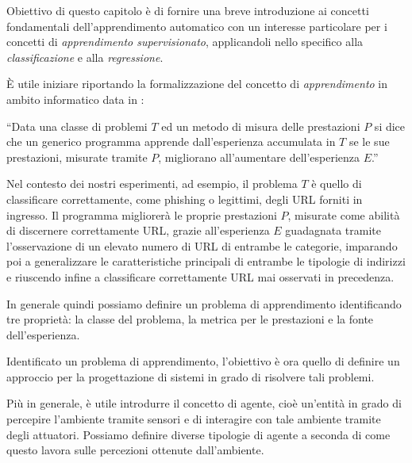 \documentclass[../../main.tex]{subfiles}
\begin{document}
    Obiettivo di questo capitolo è di fornire una breve introduzione ai concetti fondamentali dell'apprendimento automatico con un interesse particolare per i concetti di \textit{apprendimento supervisionato}, applicandoli nello specifico alla \textit{classificazione} e alla \textit{regressione}.

    È utile iniziare riportando la formalizzazione del concetto di \textit{apprendimento} in ambito informatico data in \cite{Mitchell97}:
    
    ``Data una classe di problemi $T$ ed un metodo di misura delle prestazioni $P$ si dice che un generico programma apprende dall'esperienza accumulata in $T$ se le sue prestazioni, misurate tramite $P$, migliorano all'aumentare dell'esperienza $E$.'' 

    Nel contesto dei nostri esperimenti, ad esempio, il problema $T$ è quello di classificare correttamente, come phishing o legittimi, degli URL forniti in ingresso. Il programma migliorerà le proprie prestazioni $P$, misurate come abilità di discernere correttamente URL, grazie all'esperienza  $E$ guadagnata tramite l'osservazione di un elevato numero di URL di entrambe le categorie, imparando poi a generalizzare le caratteristiche principali di entrambe le tipologie di indirizzi e riuscendo infine a classificare correttamente  URL mai osservati in precedenza.

    In generale quindi possiamo definire un problema di apprendimento identificando tre proprietà: la classe del problema, la metrica per le prestazioni e la fonte dell'esperienza.

    Identificato un problema di apprendimento, l'obiettivo è ora quello di definire un approccio per la progettazione di sistemi in grado di risolvere tali problemi.

    Più in generale, è utile introdurre il concetto di agente, cioè un'entità in grado di percepire l'ambiente tramite sensori e di interagire con tale ambiente tramite degli attuatori. Possiamo definire diverse tipologie di agente a seconda di come questo lavora sulle percezioni ottenute dall'ambiente.
\end{document}
